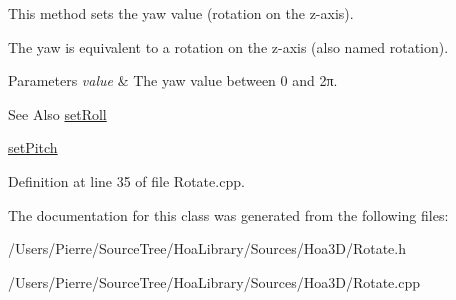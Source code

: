 This method sets the yaw value (rotation on the z-\/axis). 

The yaw is equivalent to a rotation on the z-\/axis (also named rotation).


\begin{DoxyParams}{Parameters}
{\em value} & The yaw value between 0 and 2π. \\
\hline
\end{DoxyParams}
\begin{DoxySeeAlso}{See Also}
\hyperlink{class_hoa3_d_1_1_rotate_a89599a9cd8c10240ce71b8fd7bdbb3b7}{set\-Roll} 

\hyperlink{class_hoa3_d_1_1_rotate_aeb7e844c29c2f9bb9cc7de3ef89385f6}{set\-Pitch} 
\end{DoxySeeAlso}


Definition at line 35 of file Rotate.\-cpp.



The documentation for this class was generated from the following files\-:\begin{DoxyCompactItemize}
\item 
/\-Users/\-Pierre/\-Source\-Tree/\-Hoa\-Library/\-Sources/\-Hoa3\-D/Rotate.\-h\item 
/\-Users/\-Pierre/\-Source\-Tree/\-Hoa\-Library/\-Sources/\-Hoa3\-D/Rotate.\-cpp\end{DoxyCompactItemize}
